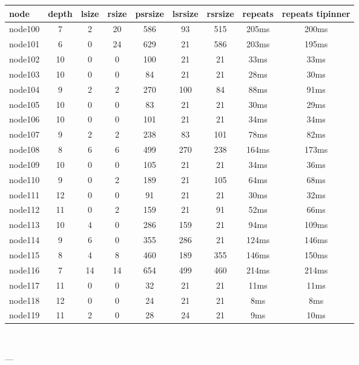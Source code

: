 \begin{tabular}{|l|c|c|c|c|c|c|c|c|}
\hline node & depth & lsize & rsize & psrsize & lsrsize & rsrsize   & repeats & repeats tipinner\\
    \hline node100 & 7 & 2 & 20 & 586 & 93 & 515 & 205ms & 200ms\\
    \hline node101 & 6 & 0 & 24 & 629 & 21 & 586 & 203ms & 195ms\\
    \hline node102 & 10 & 0 & 0 & 100 & 21 & 21 & 33ms & 33ms\\
    \hline node103 & 10 & 0 & 0 & 84 & 21 & 21 & 28ms & 30ms\\
    \hline node104 & 9 & 2 & 2 & 270 & 100 & 84 & 88ms & 91ms\\
    \hline node105 & 10 & 0 & 0 & 83 & 21 & 21 & 30ms & 29ms\\
    \hline node106 & 10 & 0 & 0 & 101 & 21 & 21 & 34ms & 34ms\\
    \hline node107 & 9 & 2 & 2 & 238 & 83 & 101 & 78ms & 82ms\\
    \hline node108 & 8 & 6 & 6 & 499 & 270 & 238 & 164ms & 173ms\\
    \hline node109 & 10 & 0 & 0 & 105 & 21 & 21 & 34ms & 36ms\\
    \hline node110 & 9 & 0 & 2 & 189 & 21 & 105 & 64ms & 68ms\\
    \hline node111 & 12 & 0 & 0 & 91 & 21 & 21 & 30ms & 32ms\\
    \hline node112 & 11 & 0 & 2 & 159 & 21 & 91 & 52ms & 66ms\\
    \hline node113 & 10 & 4 & 0 & 286 & 159 & 21 & 94ms & 109ms\\
    \hline node114 & 9 & 6 & 0 & 355 & 286 & 21 & 124ms & 146ms\\
    \hline node115 & 8 & 4 & 8 & 460 & 189 & 355 & 146ms & 150ms\\
    \hline node116 & 7 & 14 & 14 & 654 & 499 & 460 & 214ms & 214ms\\
    \hline node117 & 11 & 0 & 0 & 32 & 21 & 21 & 11ms & 11ms\\
    \hline node118 & 12 & 0 & 0 & 24 & 21 & 21 & 8ms & 8ms\\
    \hline node119 & 11 & 2 & 0 & 28 & 24 & 21 & 9ms & 10ms\\

\hline
\end{tabular} \

---


